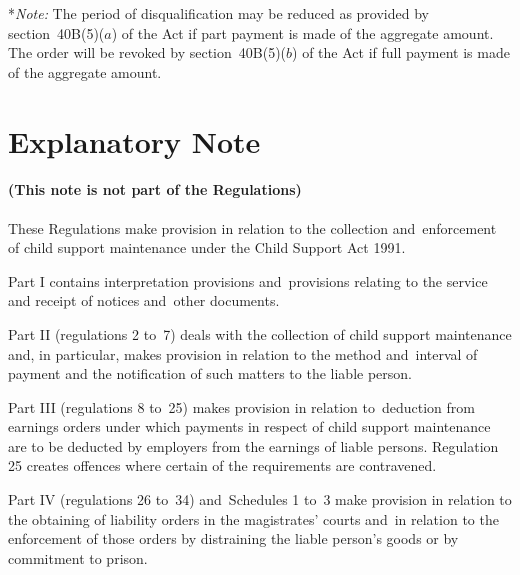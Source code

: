\documentclass[12pt,a4paper]{article}
\begin{document}
\medskip

*\emph{Note:} The period of disqualification may be reduced as provided by section~40B(5)($a$) of the Act if part payment is made of the aggregate amount.  The order will be revoked by section~40B(5)($b$) of the Act if full payment is made of the aggregate amount.


\part{Explanatory Note}

\renewcommand\parthead{--- Explanatory Note}

\subsection*{(This note is not part of the Regulations)}

 These Regulations make provision in relation to the collection and~enforcement of child support maintenance under the Child Support Act 1991.

  Part I contains interpretation provisions and~provisions relating to the service and receipt of notices and~other documents.

  Part II (regulations 2 to~7) deals with the collection of child support maintenance and, in particular, makes provision in relation to the method and~interval of payment and the notification of such matters to the liable person.

  Part III (regulations 8 to~25) makes provision in relation to~deduction from earnings orders under which payments in respect of child support maintenance are to be deducted by employers from the earnings of liable persons. Regulation 25 creates offences where certain of the requirements are contravened.

  Part IV (regulations 26 to~34) and~Schedules 1 to~3 make provision in relation to the obtaining of liability orders in the magistrates' courts and~in relation to the enforcement of those orders by distraining the liable person’s goods or by commitment to prison.
\end{document}
